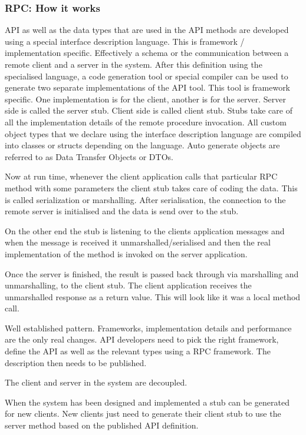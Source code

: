 \documentclass[a4paper, 11pt]{book}
\begin{document}
    \subsubsection{RPC: How it works}
    API as well as the data types that are used in the API methods are developed using a special interface description language.
    This is framework / implementation specific.
    Effectively a schema or the communication between a remote client and a server in the system.
    After this definition using the specialised language, a code generation tool or special compiler can be used to generate two separate implementations of the API tool.
    This tool is framework specific.
    One implementation is for the client, another is for the server.
    Server side is called the server stub.
    Client side is called client stub.
    Stubs take care of all the implementation details of the remote procedure invocation.
    All custom object types that we declare using the interface description language are compiled into classes or structs depending on the language.
    Auto generate objects are referred to as Data Transfer Objects or DTOs.

    Now at run time, whenever the client application calls that particular RPC method with some parameters the client stub takes care of coding the data.
    This is called serialization or marshalling.
    After serialisation, the connection to the remote server is initialised and the data is send over to the stub.

    On the other end the stub is listening to the clients application messages and when the message is received it
    unmarshalled/serialised and then the real implementation of the method is invoked on the server application.

    Once the server is finished, the result is passed back through via marshalling and unmarshalling, to the client stub.
    The client application receives the unmarshalled response as a return value.
    This will look like it was a local method call.

    Well established pattern.
    Frameworks, implementation details and performance are the only real changes.
    API developers need to pick the right framework, define the API as well as the relevant types using a RPC framework.
    The description then needs to be published.

    The client and server in the system are decoupled.

    When the system has been designed and implemented a stub can be generated for new clients.
    New clients just need to generate their client stub to use the server method based on the published API definition.
\end{document}
